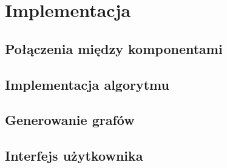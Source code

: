 \chapter{Implementacja}
\thispagestyle{chapterBeginStyle}

\section{Połączenia między komponentami}

\section{Implementacja algorytmu}

\section{Generowanie grafów}

\section{Interfejs użytkownika}
